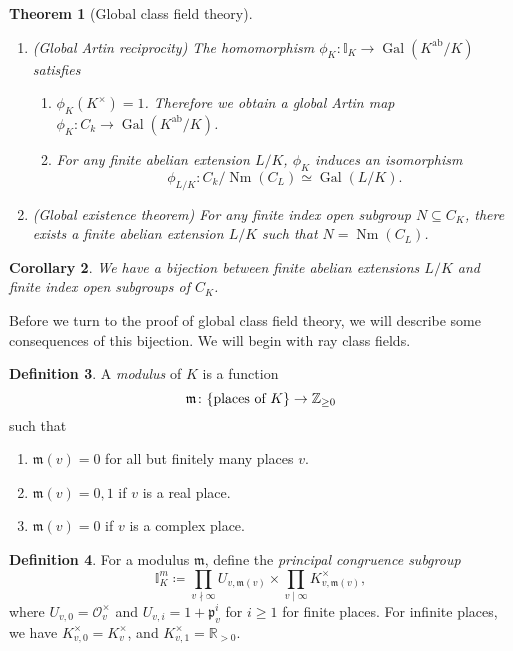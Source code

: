 \documentclass[leqno, openany]{memoir}
\newtheorem{thm}{Theorem}[section]
\newtheorem{cor}[thm]{Corollary}
\theoremstyle{definition}
\newtheorem{defn}[thm]{Definition}
\theoremstyle{remark}
\theoremstyle{plain}
\theoremstyle{definition}
\theoremstyle{remark}
\newcommand{\R}{\mathbb{R}}
\newcommand{\Z}{\mathbb{Z}}
\newcommand{\I}{\mathbb{I}}
\newcommand{\mc}[1]{\mathcal{#1}}
\newcommand{\mf}[1]{\mathfrak{#1}}
\newcommand{\mr}[1]{\mathrm{#1}}
\DeclareMathOperator{\Gal}{Gal}
\DeclareMathOperator{\Nm}{Nm}
\begin{document}
\begin{thm}[Global class field theory]\leavevmode
    \begin{enumerate}
        \item (Global Artin reciprocity) The homomorphism $\phi_K \colon \I_K \to \Gal(K^{\mr{ab}}/K)$ satisfies
            \begin{enumerate}
                \item $\phi_K(K^{\times}) = 1$. Therefore we obtain a global Artin map $\phi_K \colon C_k \to \Gal(K^{\mr{ab}}/K)$.
                \item For any finite abelian extension $L/K$, $\phi_K$ induces an isomorphism 
                    \[ \phi_{L/K} \colon C_k/\Nm(C_L) \simeq \Gal(L/K). \]
            \end{enumerate}
        \item (Global existence theorem) For any finite index open subgroup $N \subseteq C_K$, there exists a finite abelian extension $L/K$ such that $N = \Nm(C_L)$.
    \end{enumerate}
\end{thm}

\begin{cor}
    We have a bijection between finite abelian extensions $L/K$ and finite index open subgroups of $C_K$.
\end{cor}

Before we turn to the proof of global class field theory, we will describe some consequences of this bijection. We will begin with ray class fields.

\begin{defn}
    A \textit{modulus} of $K$ is a function
    \[ \mf{m} \colon \qty{\text{places of $K$}} \to \Z_{\geq 0} \]
    such that 
    \begin{enumerate}
        \item $\mf{m}(v) = 0$ for all but finitely many places $v$.
        \item $\mf{m}(v) = 0,1$ if $v$ is a real place.
        \item $\mf{m}(v) = 0$ if $v$ is a complex place.
    \end{enumerate}
\end{defn}


\begin{defn}
    For a modulus $\mf{m}$, define the \textit{principal congruence subgroup}
    \[ \I_K^m \coloneqq \prod_{v \nmid \infty} U_{v, \mf{m}(v)} \times \prod_{v \mid \infty} K_{v, \mf{m}(v)}^{\times}, \]
    where $U_{v,0} = \mc{O}_v^{\times}$ and $U_{v,i} = 1 + \mf{p}_v^i$ for $i \geq 1$ for finite places. For infinite places, we have $K_{v,0}^{\times} = K_v^{\times}$, and $K_{v,1}^{\times} = \R_{>0}$.
\end{defn}
\end{document}
